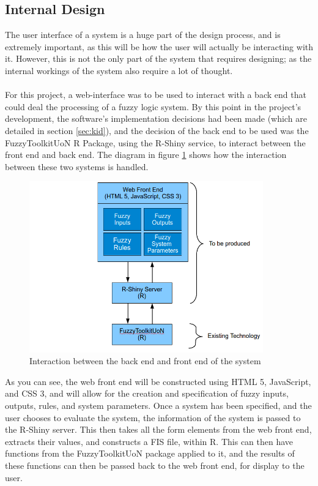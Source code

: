 \subsection{Internal Design}
The user interface of a system is a huge part of the design process, and is extremely important, as this will be how the user will actually be interacting with it. However, this is not the only part of the system that requires designing; as the internal workings of the system also require a lot of thought. \ \\
\ \\
For this project, a web-interface was to be used to interact with a back end that could deal the processing of a fuzzy logic system. By this point in the project's development, the software's implementation decisions had been made (which are detailed in section \ref{sec:kid}), and the decision of the back end to be used was the FuzzyToolkitUoN R Package, using the R-Shiny service, to interact between the front end and back end. The diagram in figure \ref{fig:architectureDiagram} shows how the interaction between these two systems is handled.

\begin{figure}[ht!]
\begin{center}
\includegraphics[width=0.9\textwidth]{images/architecture}
\end{center}
\caption{Interaction between the back end and front end of the system}
\label{fig:architectureDiagram}
\end{figure}

\noindent
As you can see, the web front end will be constructed using HTML 5, JavaScript, and CSS 3, and will allow for the creation and specification of fuzzy inputs, outputs, rules, and system parameters. Once a system has been specified, and the user chooses to evaluate the system, the information of the system is passed to the R-Shiny server. This then takes all the form elements from the web front end, extracts their values, and constructs a FIS file, within R. This can then have functions from the FuzzyToolkitUoN package applied to it, and the results of these functions can then be passed back to the web front end, for display to the user.
\newpage 